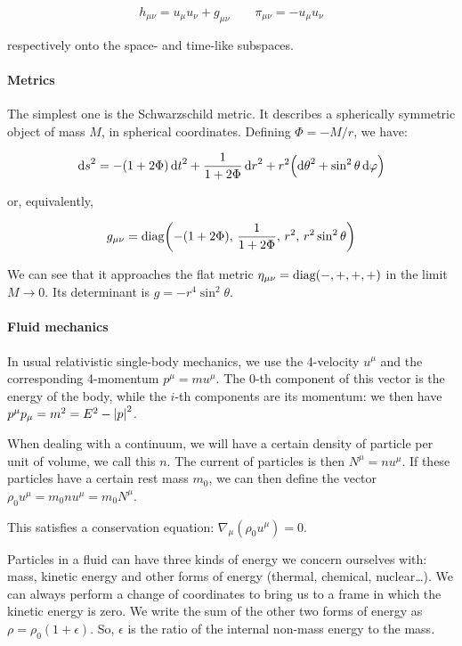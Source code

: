 \begin{equation}
    h_{\mu \nu} = u_\mu u_\nu + g_{\mu \nu} \qquad \pi_{\mu\nu} = -u_\mu u_\nu
\end{equation}

respectively onto the space- and time-like subspaces.

\paragraph{Metrics}

The simplest one is the Schwarzschild metric. It describes a spherically symmetric object of mass $M$, in spherical coordinates. Defining $\Phi = -M/r$, we have:

\begin{equation}
    \dd{s}^2 = -(1+2\Phi)\dd{t}^2 + \frac{1}{1+2\Phi} \dd{r}^2
    + r^2 \qty(\dd{\theta}^2 + \sin^2\theta \dd{\varphi}) \label{eq:schwartzshild-line-element}
\end{equation}

or, equivalently,

\begin{equation}
    g_{\mu\nu} =  \text{diag}\qty(-(1+2\Phi),\, \frac{1}{1+2\Phi},\, r^2,\, r^2 \sin ^2 \theta )
\end{equation}

We can see that it approaches the flat metric $\eta_{\mu\nu} = \text{diag}\qty(-, +, +, +)$ in the limit $M\rightarrow 0$. Its determinant is $g = -r^4 \sin^2 \theta$.

\paragraph{Fluid mechanics}

In usual relativistic single-body mechanics, we use the 4-velocity $u^\mu$ and the corresponding 4-momentum $p^\mu = m u^\mu$. The 0-th component of this vector is the energy of the body, while the $i$-th components are its momentum: we then have $p^\mu p_\mu = m^2 = E^2 - \abs{p}^2$.

When dealing with a continuum, we will have a certain density of particle per unit of volume, we call this $n$. The current of particles is then $N^\mu = n u^\mu$. If these particles have a certain rest mass $m_0$, we can then define the vector $\rho_0 u^\mu = m_0 n u^\mu = m_0 N^\mu$.

This satisfies a conservation equation: $\nabla_\mu(\rho_0 u^\mu) = 0$.

Particles in a fluid can have three kinds of energy we concern ourselves with: mass, kinetic energy and other forms of energy (thermal, chemical, nuclear\dots).
We can always perform a change of coordinates to bring us to a frame in which the kinetic energy is zero. We write the sum of the other two forms of energy as $\rho = \rho_0 (1+\epsilon)$. So, $\epsilon$ is the ratio of the internal non-mass energy to the mass.

